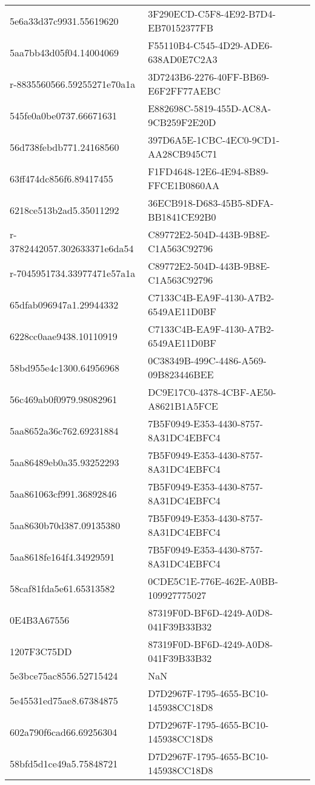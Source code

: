 \begin{tabular}{ll}
5e6a33d37c9931.55619620 & 3F290ECD-C5F8-4E92-B7D4-EB70152377FB \\
5aa7bb43d05f04.14004069 & F55110B4-C545-4D29-ADE6-638AD0E7C2A3 \\
r-8835560566.59255271e70a1a & 3D7243B6-2276-40FF-BB69-E6F2FF77AEBC \\
545fe0a0be0737.66671631 & E882698C-5819-455D-AC8A-9CB259F2E20D \\
56d738febdb771.24168560 & 397D6A5E-1CBC-4EC0-9CD1-AA28CB945C71 \\
63ff474dc856f6.89417455 & F1FD4648-12E6-4E94-8B89-FFCE1B0860AA \\
6218ce513b2ad5.35011292 & 36ECB918-D683-45B5-8DFA-BB1841CE92B0 \\
r-3782442057.302633371e6da54 & C89772E2-504D-443B-9B8E-C1A563C92796 \\
r-7045951734.33977471e57a1a & C89772E2-504D-443B-9B8E-C1A563C92796 \\
65dfab096947a1.29944332 & C7133C4B-EA9F-4130-A7B2-6549AE11D0BF \\
6228cc0aae9438.10110919 & C7133C4B-EA9F-4130-A7B2-6549AE11D0BF \\
58bd955e4c1300.64956968 & 0C38349B-499C-4486-A569-09B823446BEE \\
56c469ab0f0979.98082961 & DC9E17C0-4378-4CBF-AE50-A8621B1A5FCE \\
5aa8652a36c762.69231884 & 7B5F0949-E353-4430-8757-8A31DC4EBFC4 \\
5aa86489eb0a35.93252293 & 7B5F0949-E353-4430-8757-8A31DC4EBFC4 \\
5aa861063cf991.36892846 & 7B5F0949-E353-4430-8757-8A31DC4EBFC4 \\
5aa8630b70d387.09135380 & 7B5F0949-E353-4430-8757-8A31DC4EBFC4 \\
5aa8618fe164f4.34929591 & 7B5F0949-E353-4430-8757-8A31DC4EBFC4 \\
58caf81fda5e61.65313582 & 0CDE5C1E-776E-462E-A0BB-109927775027 \\
0E4B3A67556 & 87319F0D-BF6D-4249-A0D8-041F39B33B32 \\
1207F3C75DD & 87319F0D-BF6D-4249-A0D8-041F39B33B32 \\
5e3bce75ac8556.52715424 & NaN \\
5e45531ed75ae8.67384875 & D7D2967F-1795-4655-BC10-145938CC18D8 \\
602a790f6cad66.69256304 & D7D2967F-1795-4655-BC10-145938CC18D8 \\
58bfd5d1ce49a5.75848721 & D7D2967F-1795-4655-BC10-145938CC18D8 \\

\end{tabular}
